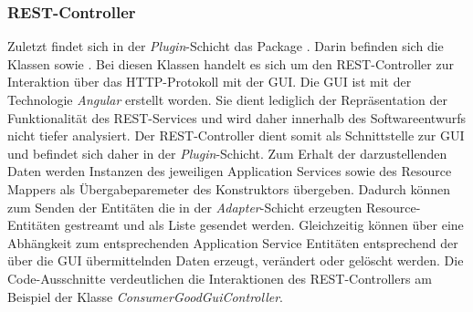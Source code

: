 \subsubsection*{REST-Controller}
Zuletzt findet sich in der \textit{Plugin}-Schicht das Package \href{https://github.com/lucasmerkel/dhbw-advancedswe-programmentwurf/tree/main/swe_programmentwurf/consumergoods-inventory-planner/0-cip-plugins/src/main/java/de/dhbw/cip/plugins/rest}{}.
Darin befinden sich die Klassen \href{https://github.com/lucasmerkel/dhbw-advancedswe-programmentwurf/blob/d5c89113d12c3b877ddc4d6a99225b277ddd468f/swe_programmentwurf/consumergoods-inventory-planner/0-cip-plugins/src/main/java/de/dhbw/cip/plugins/rest/ConsumerGoodsGuiController.java}{} sowie \href{https://github.com/lucasmerkel/dhbw-advancedswe-programmentwurf/blob/d5c89113d12c3b877ddc4d6a99225b277ddd468f/swe_programmentwurf/consumergoods-inventory-planner/0-cip-plugins/src/main/java/de/dhbw/cip/plugins/rest/StorageGuiController.java}{}.
Bei diesen Klassen handelt es sich um den \ac{REST}-Controller zur Interaktion über das HTTP-Protokoll mit der \ac{GUI}.
Die GUI ist mit der Technologie \textit{Angular} erstellt worden.
Sie dient lediglich der Repräsentation der Funktionalität des \ac{REST}-Services und wird daher innerhalb des Softwareentwurfs nicht tiefer analysiert.
Der \ac{REST}-Controller dient somit als Schnittstelle zur \ac{GUI} und befindet sich daher in der \textit{Plugin}-Schicht.
Zum Erhalt der darzustellenden Daten werden Instanzen des jeweiligen Application Services sowie des Resource Mappers als Übergabeparemeter des Konstruktors übergeben.
Dadurch können zum Senden der Entitäten die in der \textit{Adapter}-Schicht erzeugten Resource-Entitäten gestreamt und als Liste gesendet werden.
Gleichzeitig können über eine Abhängkeit zum entsprechenden Application Service Entitäten entsprechend der über die \ac{GUI} übermittelnden Daten erzeugt, verändert oder gelöscht werden.
Die Code-Ausschnitte verdeutlichen die Interaktionen des \ac{REST}-Controllers am Beispiel der Klasse \textit{ConsumerGoodGuiController}.

